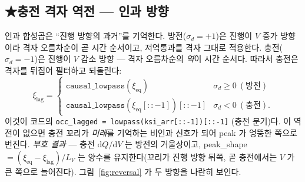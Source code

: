 \documentclass[11pt,a4paper]{article}
\newcommand{\dd}{\mathrm{d}}
\newcommand{\eq}{\mathrm{eq}}
\newcommand{\code}[1]{\texttt{#1}}
\begin{document}
\subsection{★충전 격자 역전 — 인과 방향}
인과 합성곱은 ``진행 방향의 과거''를 기억한다. 방전($\sigma_d=+1$)은 진행이 $V$ 증가 방향이라 격자 오름차순이 곧 시간
순서이고, 저역통과를 격자 그대로 적용한다. 충전($\sigma_d=-1$)은 진행이 $V$ 감소 방향 --- 격자 오름차순의 \emph{역}이
시간 순서다. 따라서 충전은 격자를 뒤집어 필터하고 되돌린다:
\begin{equation}
\xi_\mathrm{lag}=
\begin{cases}
\code{causal\_lowpass}(\xi_\eq) & \sigma_d\ge0\ (\text{방전})\\[2pt]
\code{causal\_lowpass}(\xi_\eq[::-1])[::-1] & \sigma_d<0\ (\text{충전}).
\end{cases}
\label{eq:reversal}
\end{equation}
이것이 코드의 \code{occ\_lagged = lowpass(ksi\_arr[::-1])[::-1]} (충전 분기)다. 이 역전이 없으면 충전 꼬리가
\emph{미래}를 기억하는 비인과 신호가 되어 peak 가 엉뚱한 쪽으로 번진다. \emph{부호 결과} --- 충전 $\dd Q/\dd V$ 는 방전의
거울상이고, peak\_shape $=(\xi_\eq-\xi_\mathrm{lag})/L_V$ 는 양수를 유지한다(꼬리가 진행 방향 뒤쪽, 곧 충전에서는
$V$ 가 큰 쪽으로 늘어진다). 그림~\ref{fig:reversal} 가 두 방향을 나란히 보인다.
\end{document}
